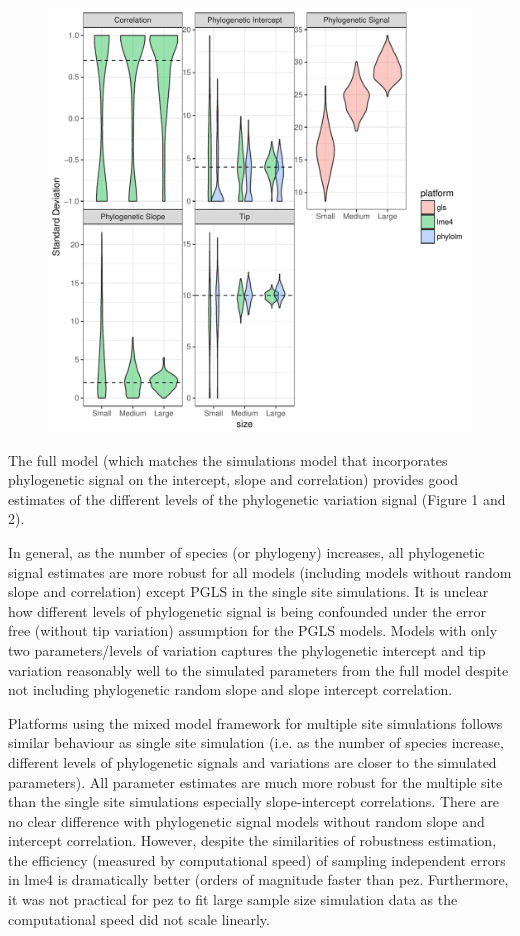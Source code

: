 \begin{center}
\begin{figure}[h]
\includegraphics[scale=0.8,page=1]{./git_push/ssplot.pdf}
\label{ssplot}
\end{figure}
\end{center}

The full model (which matches the simulations model that incorporates phylogenetic signal on the intercept, slope and correlation) provides good estimates of the different levels of the phylogenetic variation signal (Figure 1 and 2).

In general, as the number of species (or phylogeny) increases, all phylogenetic signal estimates are more robust for all models (including models without random slope and correlation) except PGLS in the single site simulations. 
It is unclear how different levels of phylogenetic signal is being confounded under the error free (without tip variation) assumption for the PGLS models.
Models with only two parameters/levels of variation captures the phylogenetic intercept and tip variation reasonably well to the simulated parameters from the full model despite not including phylogenetic random slope and slope intercept correlation.

Platforms using the mixed model framework for multiple site simulations follows similar behaviour as single site simulation (i.e. as the number of species increase, different levels of phylogenetic signals and variations are closer to the simulated parameters). 
All parameter estimates are much more robust for the multiple site than the single site simulations especially slope-intercept correlations. 
There are no clear difference with phylogenetic signal models without random slope and intercept correlation.
However, despite the similarities of robustness estimation, the efficiency (measured by computational speed) of sampling independent errors in lme4 is dramatically better (orders of magnitude faster than pez.
Furthermore, it was not practical for pez to fit large sample size simulation data as the computational speed did not scale linearly.

